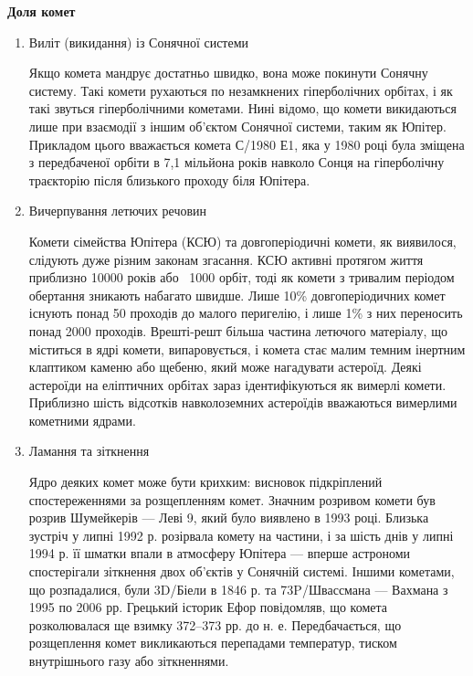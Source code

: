 \documentclass[a4paper]{article}
\begin{document}
    \textbf{Доля комет}
    \begin{enumerate}
        \item Виліт (викидання) із Сонячної системи 
        
        Якщо комета мандрує достатньо швидко, вона може покинути Сонячну систему. Такі комети рухаються по незамкнених гіперболічних орбітах, і як такі звуться гіперболічними кометами. Нині відомо, що комети викидаються лише при взаємодії з іншим об'єктом Сонячної системи, таким як Юпітер. Прикладом цього вважається комета С/1980 Е1, яка у 1980 році була зміщена з передбаченої орбіти в 7,1 мільйона років навколо Сонця на гіперболічну траєкторію після близького проходу біля Юпітера.
        
        \item Вичерпування летючих речовин 
        
        Комети сімейства Юпітера (КСЮ) та довгоперіодичні комети, як виявилося, слідують дуже різним законам згасання. КСЮ активні протягом життя приблизно 10000 років або ~1000 орбіт, тоді як комети з тривалим періодом обертання зникають набагато швидше. Лише 10\% довгоперіодичних комет існують понад 50 проходів до малого перигелію, і лише 1\% з них переносить понад 2000 проходів. Врешті-решт більша частина летючого матеріалу, що міститься в ядрі комети, випаровується, і комета стає малим темним інертним клаптиком каменю або щебеню, який може нагадувати астероїд. Деякі астероїди на еліптичних орбітах зараз ідентифікуються як вимерлі комети. Приблизно шість відсотків навколоземних астероїдів вважаються вимерлими кометними ядрами.
        
        \item Ламання та зіткнення 
        
        Ядро деяких комет може бути крихким: висновок підкріплений спостереженнями за розщепленням комет. Значним розривом комети був розрив Шумейкерів --- Леві 9, який було виявлено в 1993 році. Близька зустріч у липні 1992 р. розірвала комету на частини, і за шість днів у липні 1994 р. її шматки впали в атмосферу Юпітера --- вперше астрономи спостерігали зіткнення двох об'єктів у Сонячній системі. Іншими кометами, що розпадалися, були 3D/Біели в 1846 р. та 73P/Швассмана --- Вахмана з 1995 по 2006 рр. Грецький історик Ефор повідомляв, що комета розколювалася ще взимку 372--373 рр. до н. е. Передбачається, що розщеплення комет викликаються перепадами температур, тиском внутрішнього газу або зіткненнями.
    \end{enumerate}
    
\end{document}
